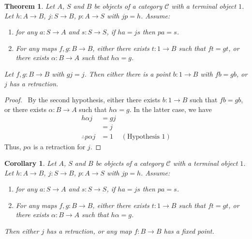 \documentclass{article}
\newtheorem{thm}[axiom]{Theorem}
\newtheorem{cor}{Corollary}[axiom]
\theoremstyle{definition}
\begin{document}
\begin{thm}
    Let $A$, $S$ and $B$ be objects of a category $\mathcal{C}$ with a terminal object $1$. Let
    $h : A \rightarrow B$,
    $j : S \rightarrow B$, $p : A \rightarrow S$ with $jp = h$. Assume:
    \begin{enumerate}
        \item
        for any $a : S \rightarrow A$ and
    $s : S \rightarrow S$, if $ha = js$ then $pa = s$. 
    \item For any maps $f, g : B \rightarrow B$, either there exists $t : 1 \rightarrow B$ such that
    $ft = gt$, or there exists $\alpha : B \rightarrow A$ such that $h \alpha = g$.
    \end{enumerate}
    Let $f, g : B \rightarrow B$ with $gj = j$. Then either there is a point $b : 1 \rightarrow B$ with
    $fb = gb$, or $j$ has a retraction.    
\end{thm}

\begin{proof}
    \pf\ By the second hypothesis, either there exists $b : 1 \rightarrow B$ such that $fb = gb$, or
    there exists $\alpha : B \rightarrow A$ such that $h \alpha = g$. In the latter case, we have
    \begin{align*}
        h \alpha j & = gj \\
        & = j \\
        \therefore p \alpha j & = 1 & (\text{Hypothesis 1})
    \end{align*}
    Thus, $p \alpha$ is a retraction for $j$.
\end{proof}

\begin{cor}
    \label{cor:Brouwer}
    Let $A$, $S$ and $B$ be objects of a category $\mathcal{C}$ with a terminal object $1$. Let
    $h : A \rightarrow B$,
    $j : S \rightarrow B$, $p : A \rightarrow S$ with $jp = h$. Assume:
    \begin{enumerate}
        \item
        for any $a : S \rightarrow A$ and
    $s : S \rightarrow S$, if $ha = js$ then $pa = s$. 
    \item For any maps $f, g : B \rightarrow B$, either there exists $t : 1 \rightarrow B$ such that
    $ft = gt$, or there exists $\alpha : B \rightarrow A$ such that $h \alpha = g$.
    \end{enumerate}
    Then either $j$ has a retraction, or any map $f : B \rightarrow B$ has a fixed point.
\end{cor}
\end{document}
